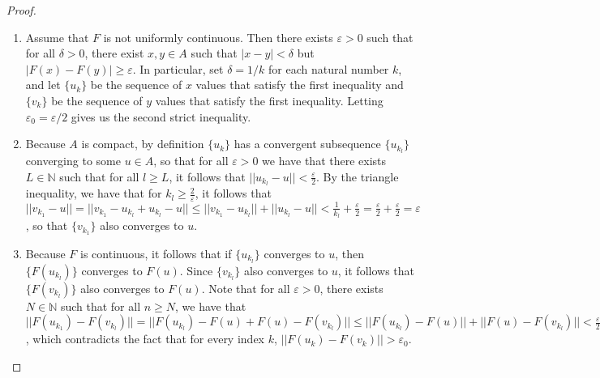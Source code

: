 \documentclass{article}
\begin{document}
\begin{proof}
\quad \\
\begin{enumerate}
    \item Assume that $F$ is not uniformly continuous. Then there exists $\varepsilon > 0$ such that for all $\delta > 0$, there exist $x, y \in A$ such that $|x-y| < \delta$ but $|F(x)-F(y)| \geq \varepsilon$. In particular, set $\delta = 1/k$ for each natural number $k$, and let $\{u_k\}$ be the sequence of $x$ values that satisfy the first inequality and $\{v_k\}$ be the sequence of $y$ values that satisfy the first inequality. Letting $\varepsilon_0 = \varepsilon/2$ gives us the second strict inequality.
    \item Because $A$ is compact, by definition $\{u_k\}$ has a convergent subsequence $\{u_{k_l}\}$ converging to some $u \in A$, so that for all $\varepsilon > 0$ we have that there exists $L \in \mathbb{N}$ such that for all $l \geq L$, it follows that $||u_{k_l} - u|| < \frac{\varepsilon}{2}$. By the triangle inequality, we have that for $k_l \geq \frac{2}{\varepsilon}$, it follows that $||v_{k_1} - u|| = ||v_{k_1} - u_{k_l} + u_{k_l} - u|| \leq ||v_{k_1} - u_{k_l}|| + ||u_{k_l} - u|| < \frac{1}{k_l} + \frac{\varepsilon}{2} = \frac{\varepsilon}{2} + \frac{\varepsilon}{2} = \varepsilon$, so that $\{v_{k_1}\}$ also converges to $u$.
    \item Because $F$ is continuous, it follows that if $\{u_{k_l}\}$ converges to $u$, then $\{F(u_{k_l})\}$ converges to $F(u)$. Since $\{v_{k_l}\}$ also converges to $u$, it follows that $\{F(v_{k_l})\}$ also converges to $F(u)$. Note that for all $\varepsilon > 0$, there exists $N \in \mathbb{N}$ such that for all $n \geq N$, we have that $||F(u_{k_1}) - F(v_{k_l})|| = ||F(u_{k_l}) - F(u) + F(u) - F(v_{k_l})|| \leq ||F(u_{k_l}) - F(u) || + ||F(u) - F(v_{k_l})|| < \frac{\varepsilon}{2} + \frac{\varepsilon}{2} = \varepsilon$, which contradicts the fact that for every index $k$, $||F(u_k) - F(v_k)|| > \varepsilon_0$.
\end{enumerate} 
\end{proof}
\end{document}
